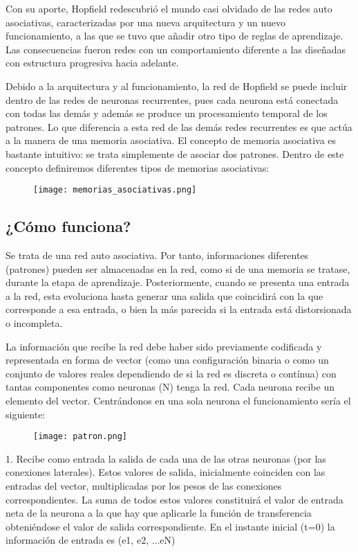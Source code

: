 \documentclass[12pt]{article}
\begin{document}
Con su aporte, Hopfield redescubrió el mundo casi olvidado de las redes auto asociativas, caracterizadas por una nueva arquitectura y un nuevo funcionamiento, a las que se tuvo que añadir otro tipo de reglas de aprendizaje. Las consecuencias fueron redes con un comportamiento diferente a las diseñadas con estructura progresiva hacia adelante.

Debido a la arquitectura y al funcionamiento, la red de Hopfield se puede incluir dentro de las redes de neuronas recurrentes, pues cada neurona está conectada con todas las demás y además se produce un procesamiento temporal de los patrones. Lo que diferencia a esta red de las demás redes recurrentes es que actúa a la manera de una memoria asociativa. El concepto de memoria asociativa es bastante intuitivo: se trata simplemente de asociar dos patrones. Dentro de este concepto definiremos diferentes tipos de memorias asociativas:

\begin{figure}[h]
\centering
\texttt{[image: memorias\_asociativas.png]}
\end{figure}

\subsection*{\LARGE{¿Cómo funciona?}}

Se trata de una red auto asociativa. Por tanto, informaciones diferentes (patrones) pueden ser almacenadas en la red, como si de una memoria se tratase, durante la etapa de aprendizaje. Posteriormente, cuando se presenta una entrada a la red, esta evoluciona hasta generar una salida que coincidirá con la que corresponde a esa entrada, o bien la más parecida si la entrada está distorsionada o incompleta.

La información que recibe la red debe haber sido previamente codificada y representada en forma de vector (como una configuración binaria o como un conjunto de valores reales dependiendo de si la red es discreta o contínua) con tantas componentes como neuronas (N) tenga la red. Cada neurona recibe un elemento del vector.
Centrándonos en una sola neurona el funcionamiento sería el siguiente:


\begin{figure}[h]
\centering
\texttt{[image: patron.png]}
\end{figure}

1.	Recibe como entrada la salida de cada una de las otras neuronas (por las conexiones laterales). Estos valores de salida, inicialmente coinciden con las entradas del vector, multiplicadas por los pesos de las conexiones correspondientes. La suma de todos estos valores constituirá el valor de entrada neta de la neurona a la que hay que aplicarle la función de transferencia obteniéndose el valor de salida correspondiente. En el instante inicial (t=0) la información de entrada es (e1, e2, ...eN)
\end{document}
